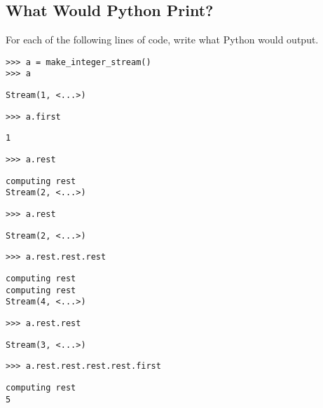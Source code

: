 \documentclass{exam}
\begin{document}
\subsection{What Would Python Print?}
\begin{questions}
\item  For each of the following lines of code, write what Python would output.

\begin{lstlisting}
>>> a = make_integer_stream()
>>> a
\end{lstlisting}
\begin{solution}[.45in]
\texttt{Stream(1, <...>)}
\end{solution}

\begin{lstlisting}
>>> a.first
\end{lstlisting}
\begin{solution}[.45in]
\texttt{1}
\end{solution}

\begin{lstlisting}
>>> a.rest
\end{lstlisting}
\begin{solution}[.45in]
\begin{lstlisting}
computing rest
Stream(2, <...>)
\end{lstlisting}
\end{solution}

\begin{lstlisting}
>>> a.rest
\end{lstlisting}
\begin{solution}[.45in]
\texttt{Stream(2, <...>)}
\end{solution}

\begin{lstlisting}
>>> a.rest.rest.rest
\end{lstlisting}
\begin{solution}[.45in]
\begin{lstlisting}
computing rest
computing rest
Stream(4, <...>)
\end{lstlisting}
\end{solution}


\begin{lstlisting}
>>> a.rest.rest
\end{lstlisting}
\begin{solution}[.45in]
\texttt{Stream(3, <...>)}
\end{solution}

\begin{lstlisting}
>>> a.rest.rest.rest.rest.first
\end{lstlisting}
\begin{solution}
\begin{lstlisting}
computing rest
5
\end{lstlisting}
\end{solution}
\end{questions}
\end{document}
